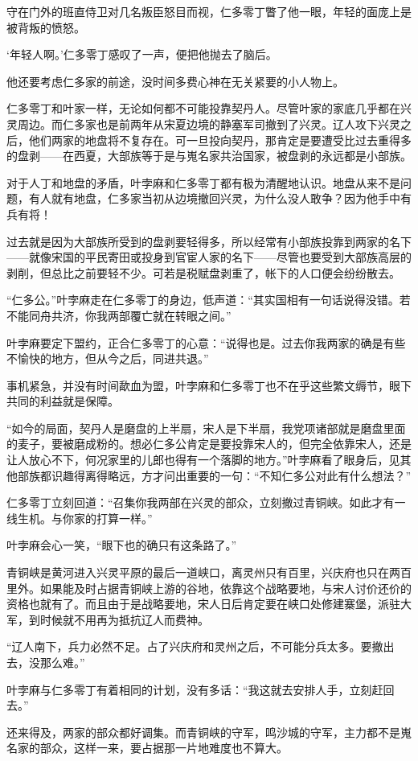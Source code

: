 守在门外的班直侍卫对几名叛臣怒目而视，仁多零丁瞥了他一眼，年轻的面庞上是被背叛的愤怒。

‘年轻人啊。’仁多零丁感叹了一声，便把他抛去了脑后。

他还要考虑仁多家的前途，没时间多费心神在无关紧要的小人物上。

仁多零丁和叶家一样，无论如何都不可能投靠契丹人。尽管叶家的家底几乎都在兴灵周边。而仁多家也是前两年从宋夏边境的静塞军司撤到了兴灵。辽人攻下兴灵之后，他们两家的地盘将不复存在。可一旦投向契丹，那肯定是要遭受比过去重得多的盘剥——在西夏，大部族等于是与嵬名家共治国家，被盘剥的永远都是小部族。

对于人丁和地盘的矛盾，叶孛麻和仁多零丁都有极为清醒地认识。地盘从来不是问题，有人就有地盘，仁多家当初从边境撤回兴灵，为什么没人敢争？因为他手中有兵有将！

过去就是因为大部族所受到的盘剥要轻得多，所以经常有小部族投靠到两家的名下——就像宋国的平民寄田或投身到官宦人家的名下——尽管也要受到大部族高层的剥削，但总比之前要轻不少。可若是税赋盘剥重了，帐下的人口便会纷纷散去。

“仁多公。”叶孛麻走在仁多零丁的身边，低声道：“其实国相有一句话说得没错。若不能同舟共济，你我两部覆亡就在转眼之间。”

叶孛麻要定下盟约，正合仁多零丁的心意：“说得也是。过去你我两家的确是有些不愉快的地方，但从今之后，同进共退。”

事机紧急，并没有时间歃血为盟，叶孛麻和仁多零丁也不在乎这些繁文缛节，眼下共同的利益就是保障。

“如今的局面，契丹人是磨盘的上半扇，宋人是下半扇，我党项诸部就是磨盘里面的麦子，要被磨成粉的。想必仁多公肯定是要投靠宋人的，但完全依靠宋人，还是让人放心不下，何况家里的儿郎也得有一个落脚的地方。”叶孛麻看了眼身后，见其他部族都识趣得离得略远，方才问出重要的一句：“不知仁多公对此有什么想法？”

仁多零丁立刻回道：“召集你我两部在兴灵的部众，立刻撤过青铜峡。如此才有一线生机。与你家的打算一样。”

叶孛麻会心一笑，“眼下也的确只有这条路了。”

青铜峡是黄河进入兴灵平原的最后一道峡口，离灵州只有百里，兴庆府也只在两百里外。如果能及时占据青铜峡上游的谷地，依靠这个战略要地，与宋人讨价还价的资格也就有了。而且由于是战略要地，宋人日后肯定要在峡口处修建寨堡，派驻大军，到时候就不用再为抵抗辽人而费神。

“辽人南下，兵力必然不足。占了兴庆府和灵州之后，不可能分兵太多。要撤出去，没那么难。”

叶孛麻与仁多零丁有着相同的计划，没有多话：“我这就去安排人手，立刻赶回去。”

还来得及，两家的部众都好调集。而青铜峡的守军，鸣沙城的守军，主力都不是嵬名家的部众，这样一来，要占据那一片地难度也不算大。

